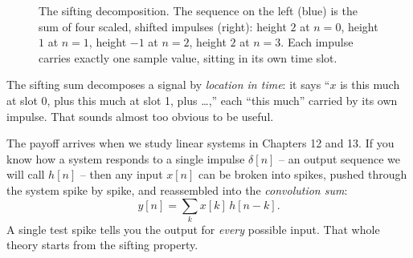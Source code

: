 \begin{figure}[h]
\centering
{}
\caption{The sifting decomposition. The sequence on the left (blue) is the sum of
four scaled, shifted impulses (right): height $2$ at $n=0$, height $1$ at $n=1$,
height $-1$ at $n=2$, height $2$ at $n=3$. Each impulse carries exactly one sample
value, sitting in its own time slot.}
\label{ch02:fig-sifting}
\end{figure}

\begin{happeningbox}
The sifting sum decomposes a signal by \emph{location in time}: it says ``$x$ is
this much at slot 0, plus this much at slot 1, plus \dots,'' each ``this much''
carried by its own impulse. That sounds almost too obvious to be useful.

The payoff arrives when we study linear systems in Chapters 12 and 13. If you know
how a system responds to a single impulse $\delta[n]$ -- an output sequence we will call
$h[n]$ -- then any input $x[n]$ can be broken into spikes, pushed through the system
spike by spike, and reassembled into the \emph{convolution sum}:
\[
  y[n] = \sum_{k} x[k]\,h[n-k].
\]
A single test spike tells you the output for \emph{every} possible input.
That whole theory starts from the sifting property.
\end{happeningbox}

